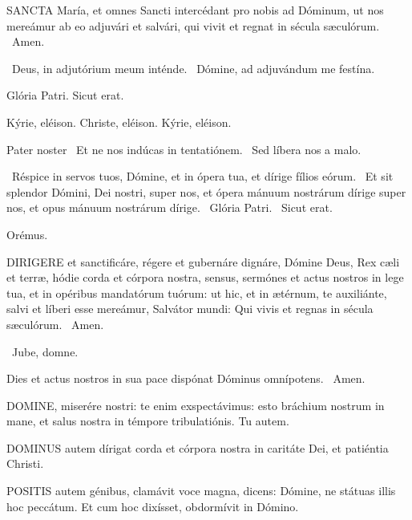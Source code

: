 
\lettrine[lines=2]{S}{ANCTA} María, et omnes Sancti intercédant pro nobis ad Dóminum, ut nos mereámur ab eo adjuvári et salvári, qui vivit et regnat in sécula sæculórum. \R\ Amen.

\V\ Deus, in adjutórium meum inténde. \R\ Dómine, ad adjuvándum me festína.

 Glória Patri. Sicut erat.

Kýrie, eléison. Christe, eléison. Kýrie, eléison.

Pater noster  \V\ Et ne nos indúcas in tentatiónem. \R\ Sed líbera nos a malo.

\V\ Réspice in servos tuos, Dómine, et in ópera tua, et dírige fílios eórum. \R\ Et sit splendor Dómini, Dei nostri, super nos, et ópera mánuum nostrárum dírige super nos, et opus mánuum nostrárum dírige. \V\ Glória Patri. \R\ Sicut erat.

Orémus. 

\lettrine[lines=2]{D}{IRIGERE} et sanctificáre, régere et gubernáre dignáre, Dómine Deus, Rex cæli et terræ, hódie corda et córpora nostra, sensus, sermónes et actus nostros in lege tua, et in opéribus mandatórum tuórum: ut hic, et in ætérnum, te auxiliánte, salvi et líberi esse mereámur, Salvátor mundi: Qui vivis et regnas in sécula sæculórum. \R\ Amen.

\V\ Jube, domne.

 Dies et actus nostros in sua pace dispónat Dóminus omnípotens. \R\ Amen.



\lettrine[lines=2]{D}{OMINE}, miserére nostri: te enim exspectávimus: esto bráchium nostrum in mane, et salus nostra in témpore tribulatiónis. Tu autem.


\lettrine[lines=2]{D}{OMINUS} autem dírigat corda et córpora nostra in caritáte Dei, et patiéntia Christi.



\lettrine[lines=2]{P}{OSITIS} autem génibus, clamávit voce magna, dicens: Dómine, ne státuas illis hoc peccátum. Et cum hoc dixísset, obdormívit in Dómino.

